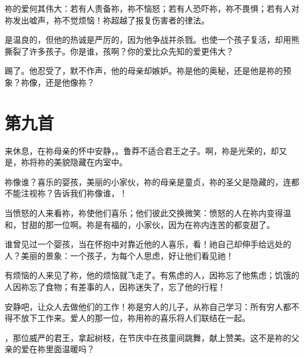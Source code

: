 祢的爱何其伟大：若有人责备祢，祢不恼怒；若有人恐吓祢，祢不畏惧；若有人对祢发出嘘声，祢不觉烦恼！祢超越了报复伤害者的律法。\par

是温良的，但他的热诚是严厉的，因为他争战并杀戮。也使一个孩子复活，却用熊撕裂了许多孩子。你是谁，孩啊？你的爱比众先知的爱更伟大？\par

踢了。他忍受了，默不作声，他的母亲却嫉妒。祢是他的奥秘，还是他是祢的预象？祢像，还是他像祢？\par


\section{第九首}

来休息，在祢母亲的怀中安静，。鲁莽不适合君王之子。啊，祢是光荣的，却又是，祢将祢的美貌隐藏在内室中。\par

祢像谁？喜乐的婴孩，美丽的小家伙，祢的母亲是童贞，祢的圣父是隐藏的，连都不能注视祢？告诉我们祢像谁，！\par

当愤怒的人来看祢，祢使他们喜乐；他们彼此交换微笑：愤怒的人在祢内变得温和，甘甜的那一位啊。祢是有福的，小家伙，因为在祢内连苦的都变甜了。\par

谁曾见过一个婴孩，当在怀抱中对靠近他的人喜乐，看！祂自己却伸手给远处的人？美丽的景象：一个孩子，为每个人思虑，好让他们看见祂！\par

有烦恼的人来见了祢，他的烦恼就飞走了。有焦虑的人，因祢忘了他焦虑；饥饿的人因祢忘了食物；有差事的人，因祢迷失了，忘了他的行程！\par

安静吧，让众人去做他们的工作！祢是穷人的儿子，从祢自己学习：所有穷人都不得不放下工作来。爱人的那一位，祢用祢的喜乐将人们联结在一起。\par

，那位威严的君王，拿起树枝，在节庆中在孩童间跳舞，献上赞美。这不是祢的父亲的爱在祢里面温暖吗？\par

